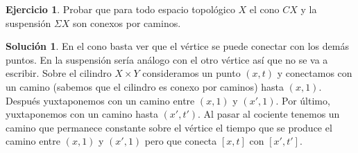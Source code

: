 \documentclass{article}
\theoremstyle{plain}
\theoremstyle{definition}
\newtheorem{exercise}{Ejercicio}
\newtheorem*{sol*}{Solución}
\begin{document}
\newpage
\begin{exercise}
Probar que para todo espacio topológico $X$ el cono $C X$ y la suspensión $\Sigma X$ son conexos por caminos.
\end{exercise}
\begin{sol*}
En el cono basta ver que el vértice se puede conectar con los demás puntos. En la suspensión sería análogo con el otro vértice así que no se va a escribir. Sobre el cilindro $X\times Y$ consideramos un punto $(x,t)$ y conectamos con un camino (sabemos que el cilindro es conexo por caminos) hasta $(x,1)$. Después yuxtaponemos con un camino entre $(x,1)$ y $(x',1)$. Por último, yuxtaponemos con un camino hasta $(x',t')$. Al pasar al cociente tenemos un camino que permanece constante sobre el vértice el tiempo que se produce el camino entre $(x,1)$ y $(x',1)$ pero que conecta $[x,t]$ con $[x',t']$.
\end{sol*}
\end{document}
